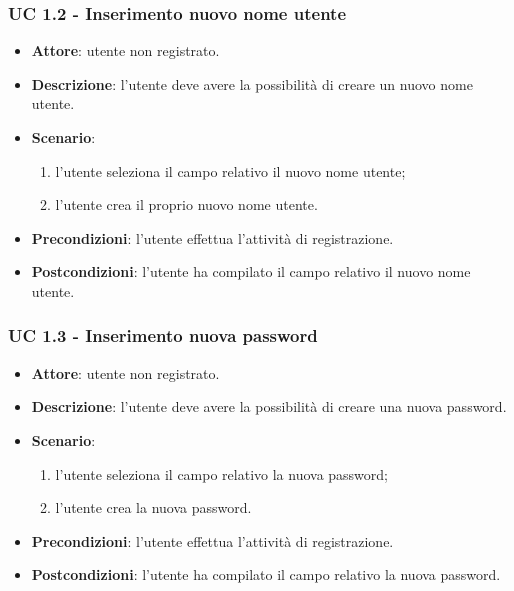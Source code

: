 \subsubsection{UC 1.2 - Inserimento nuovo nome utente}
\begin{itemize}
    \item \textbf{Attore}: utente non registrato.
    \item \textbf{Descrizione}: l'utente deve avere la possibilità di creare un nuovo nome utente.
    \item \textbf{Scenario}:
    \begin{enumerate}
        \item l'utente seleziona il campo relativo il nuovo nome utente;
        \item l'utente crea il proprio nuovo nome utente.
    \end{enumerate}
    \item \textbf{Precondizioni}: l'utente effettua l'attività di registrazione.
    \item \textbf{Postcondizioni}: l'utente ha compilato il campo relativo il nuovo nome utente.
\end{itemize}

\subsubsection{UC 1.3 - Inserimento nuova password}
\begin{itemize}
    \item \textbf{Attore}: utente non registrato.
    \item \textbf{Descrizione}: l'utente deve avere la possibilità di creare una nuova password.
    \item \textbf{Scenario}:
    \begin{enumerate}
        \item l'utente seleziona il campo relativo la nuova password;
        \item l'utente crea la nuova password.
    \end{enumerate}

    \item \textbf{Precondizioni}: l'utente effettua l'attività di registrazione.
    \item \textbf{Postcondizioni}: l'utente ha compilato il campo relativo la nuova password.
\end{itemize}


